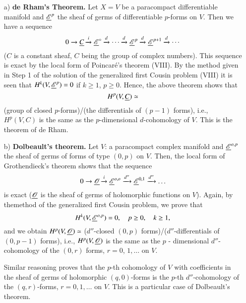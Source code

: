 \medskip
{}
\begin{itemize}
\item[a)] \textbf{de Rham's Theorem.} Let $X = V$ be a paracompact
  differentiable manifold and $\underline{\mathscr{E}}^p$ the sheaf of germs
  of differentiable $p$-forms on $V$. Then we have a sequence
$$
0 \to \underline{C} \xrightarrow{i} \underline{\mathscr{E}}^\circ \xrightarrow{d}
\cdots \xrightarrow{d} \underline{\mathscr{E}}^p \xrightarrow{d}
\underline{\mathscr{E}}^{p+1} \xrightarrow{d} \cdots
$$
($C$ is a constant sheaf, $C$ being the group of complex
numbers). This sequence is exact by the local form of Poincar\'e's
theorem (VIII). By the method given in Step 1 of the solution of the
generalized first Cousin problem (VIII) it is seen that $H^k (V,
\underline{\mathscr{E}}^p) = 0$ if $k \geq 1$, $p \geq 0$. Hence, the above
theorem shows that 
$$
H^p(V,\underline{C}) \simeq$$ 
(group of closed
$p$-forms)/(the differentials of $(p-1)$ forms),
i.e., $H^p(V,C)$ is the same as the $p$-dimensional $d$-cohomology of
 $V$. This is the theorem of de Rham. 

\item[b)] \textbf{Dolbeault's theorem.} Let $V$: a paracompact complex
  manifold and $\underline{\mathscr{E}}^{o,p}$ the sheaf of germs of forms of
  type $(0,p)$ on $V$. Then, the local form of Grothendieck's theorem
  shows that the sequence
$$
0 \to \underline{\mathscr{O}} \xrightarrow{i} \underline{\mathscr{E}}^{o,o}
\xrightarrow{d''} \underline{\mathscr{E}}^{0,1} \xrightarrow{d''} \ldots
$$
is exact ($\underline{\mathscr{O}}$ is the sheaf of germs of holomorphic
functions on $V$). Again, by the\pageoriginale method of the
generalized first Cousin problem, we prove that 
$$
H^k (V, \underline{\mathscr{E}}^{o,p}) = 0, \quad p \geq 0, \quad k \geq 1,
$$
and we obtain 
$H^p(V, \underline{\mathscr{O}}) \simeq$ ($d''$-closed $(0,p)$
forms)/($d''$-differenti\-als of $(0,p-1)$ forms),
i.e., $H^p (V,\underline{\mathscr{O}})$ is the same as the $p$ - dimensional
$d''$-cohomology of the $(0,r)$ forms, $r=0$, $1, \ldots$ on $V$. 

Similar reasoning proves that the $p$-th cohomology of $V$ with
coefficients in the sheaf of germs of holomorphic $(q,0)$-forms is the
$p$-th $d''$-cohomology of the $(q,r)$-forms, $r=0, 1, \ldots$ on
$V$. This is a particular case of Dolbeault's theorem.


\end{itemize}
